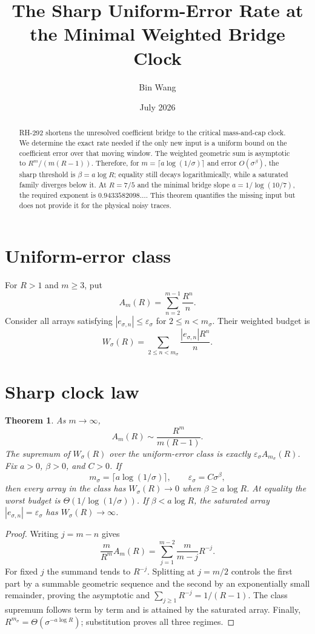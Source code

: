 \documentclass[11pt]{article}
\title{The Sharp Uniform-Error Rate at the Minimal Weighted Bridge Clock}
\author{Bin Wang}\date{July 2026}
\newtheorem{theorem}{Theorem}[section]
\theoremstyle{remark}\newtheorem{remark}[theorem]{Remark}
\begin{document}
\maketitle
\begin{abstract}
RH-292 shortens the unresolved coefficient bridge to the critical
mass-and-cap clock.  We determine the exact rate needed if the only new input
is a uniform bound on the coefficient error over that moving window.  The
weighted geometric sum is asymptotic to
$R^m/(m(R-1))$.  Therefore, for
$m=\lceil a\log(1/\sigma)\rceil$ and error
$O(\sigma^\beta)$, the sharp threshold is $\beta=a\log R$; equality still
decays logarithmically, while a saturated family diverges below it.  At
$R=7/5$ and the minimal bridge slope $a=1/\log(10/7)$, the required exponent
is $0.9433582098\ldots$.  This theorem quantifies the missing input but does
not provide it for the physical noisy traces.
\end{abstract}

\section{Uniform-error class}
For $R>1$ and $m\ge3$, put
\[
 A_m(R)=\sum_{n=2}^{m-1}\frac{R^n}{n}.
\]
Consider all arrays satisfying $|e_{\sigma,n}|\le\varepsilon_\sigma$ for
$2\le n<m_\sigma$.  Their weighted budget is
\[
 W_\sigma(R)=\sum_{2\le n<m_\sigma}
\frac{|e_{\sigma,n}|R^n}{n}.
\]

\section{Sharp clock law}
\begin{theorem}\label{thm:rate}
As $m\to\infty$,
\[
 A_m(R)\sim\frac{R^m}{m(R-1)}.
\]
The supremum of $W_\sigma(R)$ over the uniform-error class is exactly
$\varepsilon_\sigma A_{m_\sigma}(R)$.  Fix $a>0$, $\beta>0$, and $C>0$.
If
\[
 m_\sigma=\lceil a\log(1/\sigma)\rceil,\qquad
 \varepsilon_\sigma=C\sigma^\beta,
\]
then every array in the class has $W_\sigma(R)\to0$ when
$\beta\ge a\log R$.  At equality the worst budget is
$\Theta(1/\log(1/\sigma))$.  If $\beta<a\log R$, the saturated array
$|e_{\sigma,n}|=\varepsilon_\sigma$ has $W_\sigma(R)\to\infty$.
\end{theorem}
\begin{proof}
Writing $j=m-n$ gives
\[
 \frac{m}{R^m}A_m(R)=
 \sum_{j=1}^{m-2}\frac{m}{m-j}R^{-j}.
\]
For fixed $j$ the summand tends to $R^{-j}$.  Splitting at $j=m/2$
controls the first part by a summable geometric sequence and the second by
an exponentially small remainder, proving the asymptotic and
$\sum_{j\ge1}R^{-j}=1/(R-1)$.  The class supremum follows term by term and is
attained by the saturated array.  Finally,
$R^{m_\sigma}=\Theta(\sigma^{-a\log R})$; substitution proves all three
regimes.
\end{proof}
\end{document}
